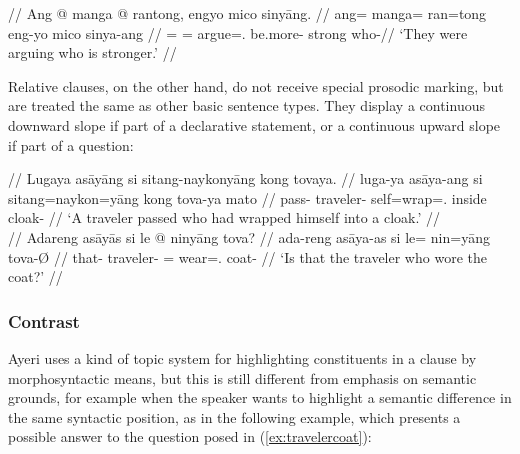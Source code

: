 \ex\begingl
	\glpreamble{} //
	\gla Ang @ manga @ rantong, engyo mico sinyāng. //
	\glb ang= manga= ran=tong eng-yo mico sinya-ang //
	\glc \AgtT{}= \Prog{}= argue=\TplN{}.\Aarg{} be.more-\TsgN{} strong
		who-\Aarg{}//
	\glft `They were arguing who is stronger.' //
\endgl\xe

Relative clauses, on the other hand, do not receive 
special prosodic marking, but are treated the same as other basic sentence 
types. They display a continuous downward slope if part of a 
declarative statement, or a continuous upward slope if part of a question:

\pex[belowexskip=0em]
\a\begingl
	\glpreamble{} //
	\gla Lugaya asāyāng si sitang-naykonyāng kong tovaya. //
	\glb luga-ya asāya-ang si sitang=naykon=yāng kong tova-ya mato //
	\glc pass-\TsgM{} traveler-\Aarg{} \Rel{} self=wrap=\TsgM{}.\Aarg{} 
		inside cloak-\Loc{} //
	\glft `A traveler passed who had wrapped himself into a cloak.' //
\endgl
\\

\a\label{ex:travelercoat}\begingl
	\glpreamble{} //
	\gla Adareng asāyās si le @ ninyāng tova? //
	\glb ada-reng asāya-as si le= nin=yāng tova-Ø //
	\glc that-\AargI{} traveler-\Parg{} \Rel{} \PatTI{}= wear=\TsgM{}.\Aarg{} 
		coat-\Top{} //
	\glft `Is that the traveler who wore the coat?' //
\endgl
\xe

\subsubsection{Contrast}

Ayeri uses a kind of topic system for
highlighting constituents in a clause by morphosyntactic means, but this is
still different from emphasis on semantic grounds, for example when the speaker
wants to highlight a semantic difference in the same syntactic position, as in
the following example, which presents a possible answer to the question posed
in (\ref{ex:travelercoat}):

